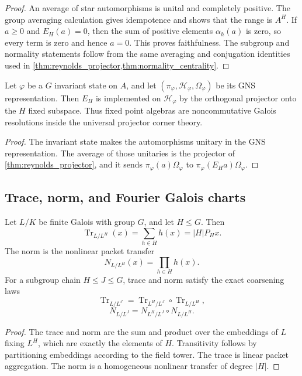 \documentclass{aomart}
\theoremstyle{definition}
\theoremstyle{remark}
\newcommand{\Hh}{\mathcal H}
\newcommand{\Tr}{\operatorname{Tr}}
\begin{document}
\begin{proof}
An average of star automorphisms is unital and completely positive. The group averaging calculation gives idempotence and shows that the range is \(A^H\). If \(a\geq0\) and \(E_H(a)=0\), then the sum of positive elements \(\alpha_h(a)\) is zero, so every term is zero and hence \(a=0\). This proves faithfulness. The subgroup and normality statements follow from the same averaging and conjugation identities used in \cref{thm:reynolds_projector,thm:normality_centrality}.
\end{proof}

\begin{corollary}\label{cor:expectation_gns_projector}
Let \(\varphi\) be a \(G\) invariant state on \(A\), and let \((\pi_\varphi,\Hh_\varphi,\Omega_\varphi)\) be its GNS representation. Then \(E_H\) is implemented on \(\Hh_\varphi\) by the orthogonal projector onto the \(H\) fixed subspace. Thus fixed point algebras are noncommutative Galois resolutions inside the universal projector corner theory.
\end{corollary}

\begin{proof}
The invariant state makes the automorphisms unitary in the GNS representation. The average of those unitaries is the projector of \cref{thm:reynolds_projector}, and it sends \(\pi_\varphi(a)\Omega_\varphi\) to \(\pi_\varphi(E_Ha)\Omega_\varphi\).
\end{proof}

\subsection{Trace, norm, and Fourier Galois charts}

\begin{proposition}\label{prop:galois_trace_norm}
Let \(L/K\) be finite Galois with group \(G\), and let \(H\leq G\). Then
\[
 \boxed{
 \Tr_{L/L^H}(x)
 =
 \sum_{h\in H}h(x)
 =
 |H|P_Hx.
 }
\]
The norm is the nonlinear packet transfer
\[
 \boxed{
 N_{L/L^H}(x)
 =
 \prod_{h\in H}h(x).
 }
\]
For a subgroup chain \(H\leq J\leq G\), trace and norm satisfy the exact coarsening laws
\[
 \Tr_{L/L^J}
 =
 \Tr_{L^H/L^J}\circ\Tr_{L/L^H},
\]
\[
 N_{L/L^J}
 =
 N_{L^H/L^J}\circ N_{L/L^H}.
\]
\end{proposition}

\begin{proof}
The trace and norm are the sum and product over the embeddings of \(L\) fixing \(L^H\), which are exactly the elements of \(H\). Transitivity follows by partitioning embeddings according to the field tower. The trace is linear packet aggregation. The norm is a homogeneous nonlinear transfer of degree \(|H|\).
\end{proof}
\end{document}
